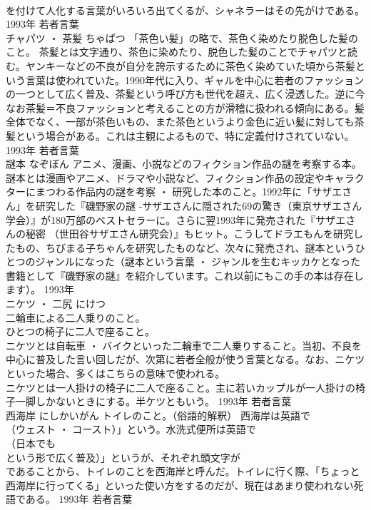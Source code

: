 \documentclass[8pt]{extreport}
\begin{document}
\begin{CJK}{UTF8}{min}
\\	を付けて人化する言葉がいろいろ出てくるが、シャネラーはその先がけである。	1993年	若者言葉	
\\	チャパツ ・ 茶髪	ちゃぱつ	「茶色い髪」の略で、茶色く染めたり脱色した髪のこと。	茶髪とは文字通り、茶色に染めたり、脱色した髪のことでチャパツと読む。ヤンキーなどの不良が自分を誇示するために茶色く染めていた頃から茶髪という言葉は使われていた。1990年代に入り、ギャルを中心に若者のファッションの一つとして広く普及、茶髪という呼び方も世代を超え、広く浸透した。逆に今なお茶髪＝不良ファッションと考えることの方が滑稽に扱われる傾向にある。髪全体でなく、一部が茶色いもの、また茶色というより金色に近い髪に対しても茶髪という場合がある。これは主観によるもので、特に定義付けされていない。	1993年	若者言葉	
\\	謎本	なぞぼん	アニメ、漫画、小説などのフィクション作品の謎を考察する本。	謎本とは漫画やアニメ、ドラマや小説など、フィクション作品の設定やキャラクターにまつわる作品内の謎を考察 ・ 研究した本のこと。1992年に「サザエさん」を研究した『磯野家の謎 -サザエさんに隠された69の驚き（東京サザエさん学会）』が180万部のベストセラーに。さらに翌1993年に発売された『サザエさんの秘密 （世田谷サザエさん研究会）』もヒット。こうしてドラエもんを研究したもの、ちびまる子ちゃんを研究したものなど、次々に発売され、謎本というひとつのジャンルになった（謎本という言葉 ・ ジャンルを生むキッカケとなった書籍として『磯野家の謎』を紹介しています。これ以前にもこの手の本は存在します）。	1993年	
\\	ニケツ ・ 二尻	にけつ	
\\	二輪車による二人乗りのこと。 
\\	ひとつの椅子に二人で座ること。	
\\	ニケツとは自転車 ・ バイクといった二輪車で二人乗りすること。当初、不良を中心に普及した言い回しだが、次第に若者全般が使う言葉となる。なお、ニケツといった場合、多くはこちらの意味で使われる。 
\\	ニケツとは一人掛けの椅子に二人で座ること。主に若いカップルが一人掛けの椅子一脚しかないときにする。半ケツともいう。	1993年	若者言葉	
\\	西海岸	にしかいがん	トイレのこと。（俗語的解釈）	西海岸は英語で
\\	（ウェスト ・ コースト）」という。水洗式便所は英語で
\\	（日本でも
\\	という形で広く普及）」というが、それぞれ頭文字が
\\	であることから、トイレのことを西海岸と呼んだ。トイレに行く際、「ちょっと西海岸に行ってくる」といった使い方をするのだが、現在はあまり使われない死語である。	1993年	若者言葉	

\end{CJK}
\end{document}

